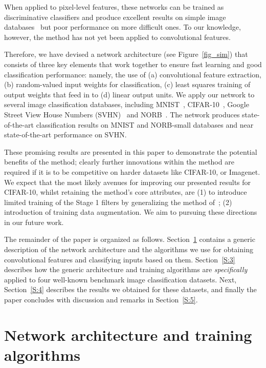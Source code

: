 \documentclass[conference]{IEEEtran}
\begin{document}
When applied  to pixel-level features, these networks can be trained as discriminative classifiers and produce excellent results on simple image databases~\cite{vanSchaik.14,Tapson.14,Yu.12,Zhu.14,McDonnell.15PLOS,Zhu.15} but poor performance on more difficult ones.  To our knowledge, however, the method has not yet been applied to  convolutional features.

Therefore, we  have devised a network architecture (see Figure~\ref{fig_sim}) that consists of three key elements that work together to ensure fast learning and good classification performance: namely, the use of (a) convolutional feature extraction, (b) random-valued input weights for classification, (c) least squares training of output weights that feed in to (d) linear output units. We apply our network to several  image classification databases, including MNIST~\cite{MNIST}, CIFAR-10~\cite{Krizhevsky}, Google Street View House Numbers (SVHN)~\cite{SVHN} and NORB~\cite{LeCun.04}. The network produces state-of-the-art classification results on MNIST and NORB-small databases and near state-of-the-art performance on SVHN. 

These promising results are presented in this paper to demonstrate the potential benefits of the method; clearly further innovations within the method are required if it is to be competitive on harder datasets like CIFAR-10, or Imagenet. We expect that the most likely avenues for improving our presented results for CIFAR-10, whilst retaining the method's core attributes, are (1) to introduce limited training of the Stage 1 filters by generalizing the method of~\cite{Yu.12}; (2)  introduction of training data augmentation. We aim to pursuing these directions in our future work.

The remainder of the paper is organized as follows. Section~\ref{S:2} contains a generic description of the network architecture and the algorithms we use for obtaining convolutional features and classifying inputs based on them. Section~\ref{S:3} describes how the generic architecture and training algorithms are {\em specifically} applied to four well-known benchmark image classification datasets. Next, Section~\ref{S:4} describes the results we obtained for these datasets, and finally the paper concludes with discussion and remarks in Section~\ref{S:5}.







\section{Network architecture and training algorithms}\label{S:2}
\end{document}

